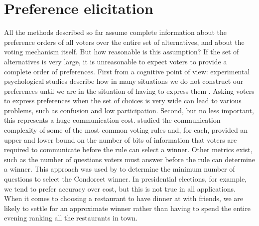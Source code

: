 \newpage
\section{Preference elicitation}
\label{sec:litMNMX}

All the methods described so far assume complete information about the preference orders of all voters over the entire set of alternatives, and about the voting mechanism itself. But how reasonable is this assumption?
If the set of alternatives is very large, it is unreasonable to expect voters to provide a complete order of preferences. First from a cognitive point of view: experimental psychological studies describe how in many situations we do not construct  our preferences until we are in the situation of having to express them \citep{Lichtenstein2006}. Asking voters to express preferences when the set of choices is very wide can lead to various problems, such as confusion and low participation.
Second, but no less important, this represents a huge communication cost. \citet{Conitzer2005} studied the communication complexity of some of the most common voting rules and, for each, provided an upper and lower bound on the number of bits of information that voters are required to communicate before the rule can select a winner. Other metrics exist, such as the number of questions voters must answer before the rule can determine a winner. This approach was used by \citet{Procaccia2008} to determine the minimum number of questions to select the Condorcet winner.
In presidential elections, for example, we tend to prefer accuracy over cost, but this is not true in all applications. When it comes to choosing a restaurant to have dinner at with friends, we are likely to settle for an approximate winner rather than having to spend the entire evening ranking all the restaurants in town.
